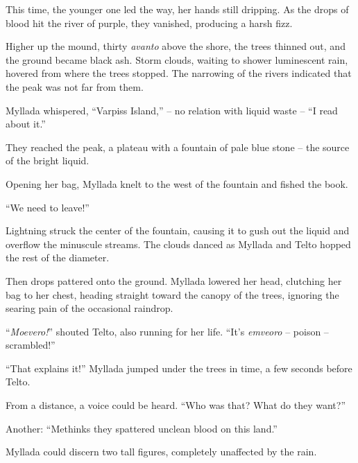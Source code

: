This time, the younger one led the way, her hands still dripping. As the drops of blood hit the river of purple, they vanished, producing a harsh fizz.

Higher up the mound, thirty \emph{avanto} above the shore, the trees thinned out, and the ground became black ash. Storm clouds, waiting to shower luminescent rain, hovered from where the trees stopped. The narrowing of the rivers indicated that the peak was not far from them.

Myllada whispered, ``Varpiss Island,'' -- no relation with liquid waste -- ``I read about it.''

\centeredstars

They reached the peak, a plateau with a fountain of pale blue stone -- the source of the bright liquid.

Opening her bag, Myllada knelt to the west of the fountain and fished the book.


``We need to leave!''

Lightning struck the center of the fountain, causing it to gush out the liquid and overflow the minuscule streams. The clouds danced as Myllada and Telto hopped the rest of the diameter.

Then drops pattered onto the ground. Myllada lowered her head, clutching her bag to her chest, heading straight toward the canopy of the trees, ignoring the searing pain of the occasional raindrop.

``\emph{Moevero!}'' shouted Telto, also running for her life. ``It's \emph{emveoro} -- poison -- scrambled!''

``That explains it!'' Myllada jumped under the trees in time, a few seconds before Telto.

From a distance, a voice could be heard. ``Who was that? What do they want?''

Another: ``Methinks they spattered unclean blood on this land.''

Myllada could discern two tall figures, completely unaffected by the rain.

